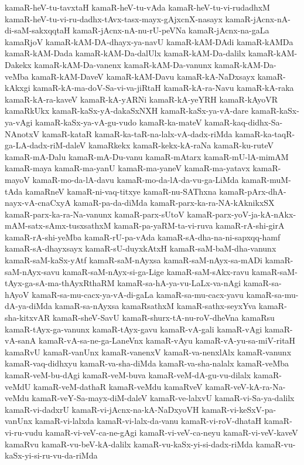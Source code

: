 {kamaR-heV-tu-tavxtaH
kamaR-heV-tu-vAda
kamaR-heV-tu-vi-rudadhxM
kamaR-heV-tu-vi-ru-dadhx-tAvx-tasx-mayx-gAjxcnX-nasayx
kamaR-jAcnx-nA-di-saM-sakxqqtaH
kamaR-jAcnx-nA-nu-rU-peVNa
kamaR-jAcnx-na-gaLa
kamaRjoV
kamaR-kAM-DA-dhayx-ya-navU
kamaR-kAM-DAdi
kamaR-kAMDa
kamaR-kAM-Dada
kamaR-kAM-Da-dalUlx
kamaR-kAM-Da-dalilx
kamaR-kAM-Dakekx
kamaR-kAM-Da-vanenx
kamaR-kAM-Da-vanunx
kamaR-kAM-Da-veMba
kamaR-kAM-DaveV
kamaR-kAM-Davu
kamaR-kA-NaDxsayx
kamaR-kAkxgi
kamaR-kA-ma-doV-Sa-vi-va-jiRtaH
kamaR-kA-ra-Navu
kamaR-kA-raka
kamaR-kA-ra-kaveV
kamaR-kA-yARNi
kamaR-kA-yeYRH
kamaR-kAyoVR
kamaRkUkx
kamaR-kaSx-yA-dakaSxNXH
kamaR-kaSx-ya-vA-dare
kamaR-kaSx-ya-vAgi
kamaR-kaSx-ya-vA-gu-vudo
kamaR-ka-mateV
kamaR-kaq-didhx-Sa-NAnotxV
kamaR-kataR
kamaR-ka-taR-na-lalx-vA-dadx-riMda
kamaR-ka-taqR-ga-LA-dadx-riM-daleV
kamaRkekx
kamaR-kekx-kA-raNa
kamaR-ku-ruteV
kamaR-mA-Dalu
kamaR-mA-Du-vanu
kamaR-mAtarx
kamaR-mU-lA-mimAM
kamaR-maya
kamaR-ma-yanU
kamaR-ma-yaneV
kamaR-ma-yatavx
kamaR-mayoV
kamaR-mo-da-lA-davu
kamaR-mo-da-lA-da-vu-ga-LiMda
kamaR-muM-tAda
kamaRneV
kamaR-ni-vaq-titxye
kamaR-nu-SAThxna
kamaR-pArx-dhA-nayx-vA-cnaCxyA
kamaR-pa-da-diMda
kamaR-parx-ka-ra-NA-kAknikxSX
kamaR-parx-ka-ra-Na-vanunx
kamaR-parx-sUtoV
kamaR-parx-yoV-ja-kA-nAkx-mAM-satx-sAmx-tusxsathxM
kamaR-pa-yaRM-ta-vi-ruva
kamaR-rA-shi-girA
kamaR-rA-shi-yeMba
kamaR-rU-pa-vAda
kamaR-sA-dha-na-ni-sapxqq-hamf
kamaR-sA-dhayxsayx
kamaR-sU-duyxkAtxH
kamaR-saM-baM-dha-vanunx
kamaR-saM-kaSx-yAtf
kamaR-saM-nAyxsa
kamaR-saM-nAyx-sa-mADi
kamaR-saM-nAyx-savu
kamaR-saM-nAyx-si-ga-Lige
kamaR-saM-sAkx-ravu
kamaR-saM-tAyx-ga-sA-ma-thAyxRthaRM
kamaR-sa-hA-ya-vu-LaLx-va-nAgi
kamaR-sa-hAyoV
kamaR-sa-mu-cacx-ya-vA-di-gaLa
kamaR-sa-mu-cacx-yavu
kamaR-sa-mu-dA-ya-diMda
kamaR-sa-nAyxsa
kamaRsathxM
kamaR-sathx-seyxYva
kamaR-sha-kitxvAR
kamaR-sheV-SavU
kamaR-shurx-tA-nu-roV-dheVna
kamaRsu
kamaR-tAyx-ga-vanunx
kamaR-tAyx-gavu
kamaR-vA-gali
kamaR-vAgi
kamaR-vA-sanA
kamaR-vA-sa-ne-ga-LaneVnx
kamaR-vAyu
kamaR-vA-yu-sa-miV-ritaH
kamaRvU
kamaR-vanUnx
kamaR-vanenxV
kamaR-va-nenxlAlx
kamaR-vanunx
kamaR-vaq-didhxyu
kamaR-va-sha-diMda
kamaR-va-sha-nalalx
kamaR-veMba
kamaR-veM-bu-dAgi
kamaR-veM-buva
kamaR-veM-dA-gu-vu-dilalx
kamaR-veMdU
kamaR-veM-dathaR
kamaR-veMdu
kamaRveV
kamaR-veV-kA-ra-Na-veMdu
kamaR-veY-Sa-mayx-diM-daleV
kamaR-ve-lalxvU
kamaR-vi-Sa-ya-dalilx
kamaR-vi-dadxrU
kamaR-vi-jAcnx-na-kA-NaDxyoVH
kamaR-vi-keSxV-pa-vanUnx
kamaR-vi-lalxda
kamaR-vi-lalx-da-vanu
kamaR-vi-roV-dhataH
kamaR-vi-ru-vudu
kamaR-vi-veV-ca-ne-gAgi
kamaR-vi-veV-ca-neyu
kamaR-vi-veV-kaveV
kamaRvu
kamaR-vu-beV-kA-dalilx
kamaR-vu-kaSx-yi-si-dadx-riMda
kamaR-vu-kaSx-yi-si-ru-vu-da-riMda
}
